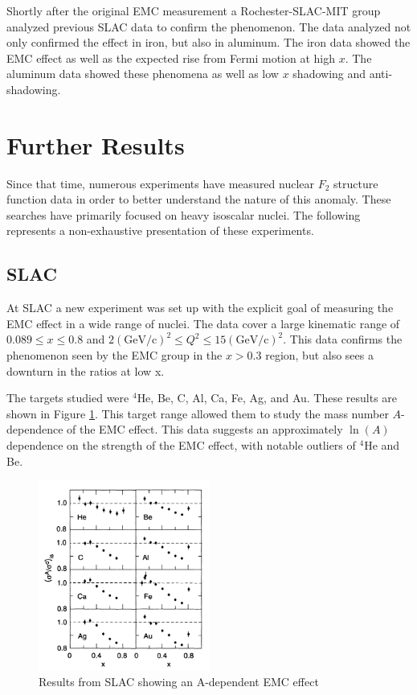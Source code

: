 Shortly after the original EMC measurement a Rochester-SLAC-MIT group analyzed previous SLAC data to confirm the phenomenon. The data analyzed not only confirmed the effect in iron, but also in aluminum. The iron data showed the EMC effect as well as the expected rise from Fermi motion at high $x$. The aluminum data showed these phenomena as well as low $x$ shadowing and anti-shadowing. \cite{bodek_Fe,bodek_Al,Norton}

\section{Further Results}

Since that time, numerous experiments have measured nuclear $F_2$ structure function data in order to better understand the nature of this anomaly. These searches have primarily focused on heavy isoscalar nuclei. The following represents a non-exhaustive presentation of these experiments.

\subsection{SLAC}
At SLAC a new experiment was set up with the explicit goal of measuring the EMC effect in a wide range of nuclei. The data cover a large kinematic range of $0.089 \le x \le 0.8$ and $2 \left(\textrm{GeV/c}\right)^2 \le Q^2 \le 15 \left(\textrm{GeV/c}\right)^2$. This data confirms the phenomenon seen by the EMC group in the $x>0.3$ region, but also sees a downturn in the ratios at low x. 

The targets studied were $^4$He, Be, C, Al, Ca, Fe, Ag, and Au. These results are shown in Figure \ref{gomez_results}. This target range allowed them to study the mass number $A$-dependence of the EMC effect. This data suggests an approximately $\ln\left(A\right)$ dependence on the strength of the EMC effect, with notable outliers of $^4$He and Be. \cite{Arnold,Gomez}

\begin{figure}[h]
\begin{center}
	\includegraphics[width=0.5\textwidth]{./EMC/fig/gomez.png}
	\caption{Results from SLAC showing an A-dependent EMC effect\cite{Gomez}}
	\label{gomez_results}
\end{center}
\end{figure}

